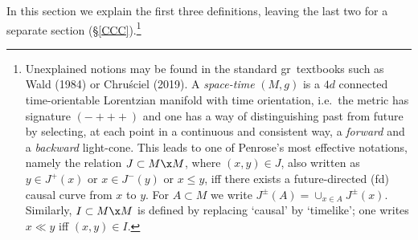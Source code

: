 \documentclass[11pt,a4paper]{article}
\newcommand{\GR}{{\sc gr}}
\begin{document}
In this section we explain the first three definitions, leaving the last two for a separate section (\S\ref{CCC}).\footnote{
Unexplained notions may be found in the standard \GR\ textbooks such as Wald (1984) or  Chru\'{s}ciel (2019).
A
\emph{space-time} $(M,g)$ is a $4d$ connected time-orientable Lorentzian manifold with time orientation, i.e.\ the metric has signature $(-+++)$ and one has a way of distinguishing past from future by selecting, at each point in a continuous and consistent way, a \emph{forward} and a \emph{backward} light-cone. This  leads to one of Penrose's most effective notations, namely the relation  $J\subset M\x M$,  where  $(x,y)\in J$, also written as $y\in J^+(x)$ or $x\in J^-(y)$ or $x\leq y$, iff  there exists a future-directed (fd) causal curve from $x$ to $y$. For $A\subset M$ we write $J^{\pm}(A)=\cup_{x\in A}J^{\pm}(x)$.
Similarly, $I\subset M\x M$ is defined by replacing `causal' by `timelike'; one writes $x\ll y$ iff  $(x,y)\in I$.}
\end{document}
